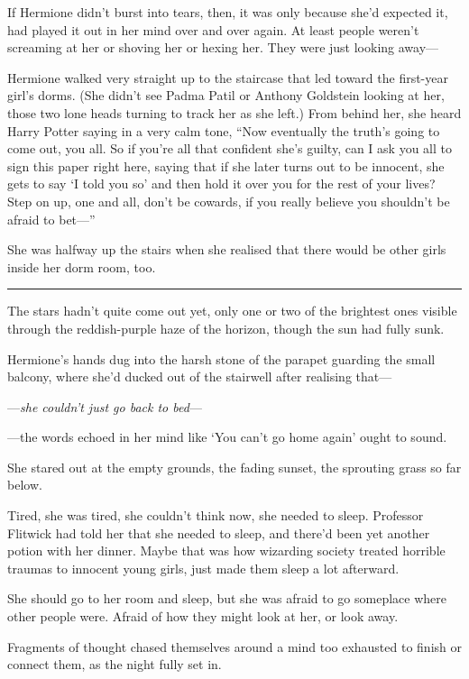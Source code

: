 If Hermione didn't burst into tears, then, it was only because she'd
expected it, had played it out in her mind over and over again. At least
people weren't screaming at her or shoving her or hexing her. They were
just looking away---

Hermione walked very straight up to the staircase that led toward the
first-year girl's dorms. (She didn't see Padma Patil or Anthony
Goldstein looking at her, those two lone heads turning to track her as
she left.) From behind her, she heard Harry Potter saying in a very calm
tone, ``Now eventually the truth's going to come out, you all. So if
you're all that confident she's guilty, can I ask you all to sign this
paper right here, saying that if she later turns out to be innocent, she
gets to say `I told you so' and then hold it over you for the rest of
your lives? Step on up, one and all, don't be cowards, if you really
believe you shouldn't be afraid to bet---''

She was halfway up the stairs when she realised that there would be
other girls inside her dorm room, too.

\begin{center}\rule{3in}{0.4pt}\end{center}

The stars hadn't quite come out yet, only one or two of the brightest
ones visible through the reddish-purple haze of the horizon, though the
sun had fully sunk.

Hermione's hands dug into the harsh stone of the parapet guarding the
small balcony, where she'd ducked out of the stairwell after realising
that---

---\emph{she couldn't just go back to bed}---

---the words echoed in her mind like `You can't go home again' ought to
sound.

She stared out at the empty grounds, the fading sunset, the sprouting
grass so far below.

Tired, she was tired, she couldn't think now, she needed to sleep.
Professor Flitwick had told her that she needed to sleep, and there'd
been yet another potion with her dinner. Maybe that was how wizarding
society treated horrible traumas to innocent young girls, just made them
sleep a lot afterward.

She should go to her room and sleep, but she was afraid to go someplace
where other people were. Afraid of how they might look at her, or look
away.

Fragments of thought chased themselves around a mind too exhausted to
finish or connect them, as the night fully set in.


